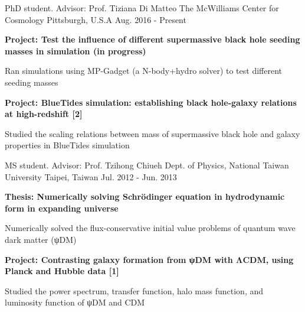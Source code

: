 


\begin{cventries}



\cventry
{PhD student. Advisor: Prof. Tiziana Di Matteo} %
{The McWilliams Center for Cosmology} %
{Pittsburgh, U.S.A} %
{Aug. 2016 - Present} %
{ %
\begin{cvitems}
\item \textbf{Project: Test the influence of different supermassive black hole seeding masses in simulation (in progress)}
\item {Ran simulations using MP-Gadget (a N-body+hydro solver) to test different seeding masses}
\item \textbf{Project: BlueTides simulation: establishing black hole-galaxy relations at high-redshift [2]}
\item {Studied the scaling relations between mass of supermassive black hole and galaxy properties in BlueTides simulation}
\end{cvitems}
}


\cventry
{MS student. Advisor: Prof. Tzihong Chiueh} %
{Dept. of Physics, National Taiwan University} %
{Taipei, Taiwan} %
{Jul. 2012 - Jun. 2013} %
{ %
\begin{cvitems}
\item \textbf{Thesis: Numerically solving Schrödinger equation in hydrodynamic form in expanding universe}
\item {Numerically solved the flux-conservative initial value problems of quantum wave dark matter (ψDM)}
\item \textbf{Project: Contrasting galaxy formation from ψDM with ΛCDM, using Planck and Hubble data [1]}
\item {Studied the power spectrum, transfer function, halo mass function, and luminosity function of ψDM and CDM}
\end{cvitems}
}


\end{cventries}
